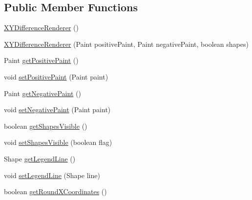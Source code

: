 \subsection*{Public Member Functions}
\begin{DoxyCompactItemize}
\item 
\mbox{\hyperlink{classorg_1_1jfree_1_1chart_1_1renderer_1_1xy_1_1_x_y_difference_renderer_a95b17b1bfadbfa33f2aeea68290234fb}{X\+Y\+Difference\+Renderer}} ()
\item 
\mbox{\hyperlink{classorg_1_1jfree_1_1chart_1_1renderer_1_1xy_1_1_x_y_difference_renderer_ab601152145cd054dc2baa6e24371bca8}{X\+Y\+Difference\+Renderer}} (Paint positive\+Paint, Paint negative\+Paint, boolean shapes)
\item 
Paint \mbox{\hyperlink{classorg_1_1jfree_1_1chart_1_1renderer_1_1xy_1_1_x_y_difference_renderer_a6af43e7afd9ffcacb0d8569d7826902b}{get\+Positive\+Paint}} ()
\item 
void \mbox{\hyperlink{classorg_1_1jfree_1_1chart_1_1renderer_1_1xy_1_1_x_y_difference_renderer_aff455c06592dff18318ed28661cb7860}{set\+Positive\+Paint}} (Paint paint)
\item 
Paint \mbox{\hyperlink{classorg_1_1jfree_1_1chart_1_1renderer_1_1xy_1_1_x_y_difference_renderer_a3e10af01cab6acff914d6b2adf9e8371}{get\+Negative\+Paint}} ()
\item 
void \mbox{\hyperlink{classorg_1_1jfree_1_1chart_1_1renderer_1_1xy_1_1_x_y_difference_renderer_adb29167bb5918e400d750c52a5c608e3}{set\+Negative\+Paint}} (Paint paint)
\item 
boolean \mbox{\hyperlink{classorg_1_1jfree_1_1chart_1_1renderer_1_1xy_1_1_x_y_difference_renderer_a29eb3619b03bae151989da762c41d2c9}{get\+Shapes\+Visible}} ()
\item 
void \mbox{\hyperlink{classorg_1_1jfree_1_1chart_1_1renderer_1_1xy_1_1_x_y_difference_renderer_a19d0ac0748a1b8eab687aac2f6a352c1}{set\+Shapes\+Visible}} (boolean flag)
\item 
Shape \mbox{\hyperlink{classorg_1_1jfree_1_1chart_1_1renderer_1_1xy_1_1_x_y_difference_renderer_a9abc4d678f9347c6b90bbd12aa1c0ce7}{get\+Legend\+Line}} ()
\item 
void \mbox{\hyperlink{classorg_1_1jfree_1_1chart_1_1renderer_1_1xy_1_1_x_y_difference_renderer_a2ba2e4bf1207ba913658ed95ed0c8211}{set\+Legend\+Line}} (Shape line)
\item 
boolean \mbox{\hyperlink{classorg_1_1jfree_1_1chart_1_1renderer_1_1xy_1_1_x_y_difference_renderer_aa98e8a1cd320c4a9f90c1f1d2727c2e6}{get\+Round\+X\+Coordinates}} ()

\end{DoxyCompactItemize}
